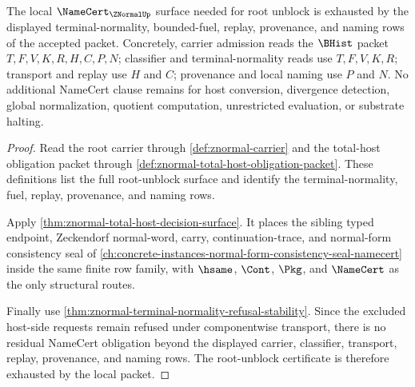 \begin{theorem}
\label{thm:znormal-root-unblock-namecert-exhaustion}
The local $\NameCert_{\ZNormalUp}$ surface needed for root unblock is exhausted by the displayed terminal-normality, bounded-fuel, replay, provenance, and naming rows of the accepted packet. Concretely, carrier admission reads the $\BHist$ packet $T,F,V,K,R,H,C,P,N$; classifier and terminal-normality reads use $T,F,V,K,R$; transport and replay use $H$ and $C$; provenance and local naming use $P$ and $N$. No additional NameCert clause remains for host conversion, divergence detection, global normalization, quotient computation, unrestricted evaluation, or substrate halting.
\end{theorem}
\begin{proof}
Read the root carrier through \autoref{def:znormal-carrier} and the total-host obligation packet through \autoref{def:znormal-total-host-obligation-packet}. These definitions list the full root-unblock surface and identify the terminal-normality, fuel, replay, provenance, and naming rows.

Apply \autoref{thm:znormal-total-host-decision-surface}. It places the sibling typed endpoint, Zeckendorf normal-word, carry, continuation-trace, and normal-form consistency seal of \autoref{ch:concrete-instances-normal-form-consistency-seal-namecert} inside the same finite row family, with $\hsame$, $\Cont$, $\Pkg$, and $\NameCert$ as the only structural routes.

Finally use \autoref{thm:znormal-terminal-normality-refusal-stability}. Since the excluded host-side requests remain refused under componentwise transport, there is no residual NameCert obligation beyond the displayed carrier, classifier, transport, replay, provenance, and naming rows. The root-unblock certificate is therefore exhausted by the local packet.
\end{proof}

